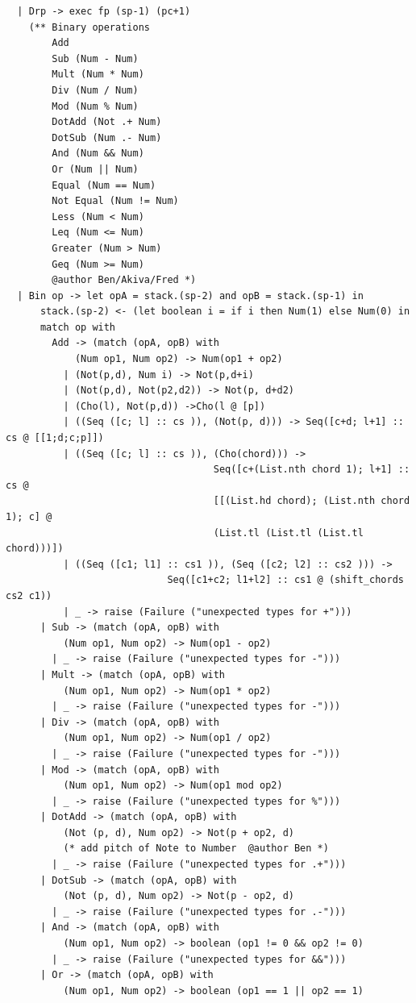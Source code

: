 \documentclass[12pt,A4]{book}
\begin{document}
\begin{verbatim}
  | Drp -> exec fp (sp-1) (pc+1)
    (** Binary operations
        Add
        Sub (Num - Num)
        Mult (Num * Num)
        Div (Num / Num)
        Mod (Num % Num)
        DotAdd (Not .+ Num)
        DotSub (Num .- Num)
        And (Num && Num)
        Or (Num || Num)
        Equal (Num == Num)
        Not Equal (Num != Num)
        Less (Num < Num)
        Leq (Num <= Num)
        Greater (Num > Num)
        Geq (Num >= Num) 
        @author Ben/Akiva/Fred *)
  | Bin op -> let opA = stack.(sp-2) and opB = stack.(sp-1) in     
      stack.(sp-2) <- (let boolean i = if i then Num(1) else Num(0) in
      match op with
        Add -> (match (opA, opB) with 
            (Num op1, Num op2) -> Num(op1 + op2)
          | (Not(p,d), Num i) -> Not(p,d+i)
          | (Not(p,d), Not(p2,d2)) -> Not(p, d+d2)
          | (Cho(l), Not(p,d)) ->Cho(l @ [p])
          | ((Seq ([c; l] :: cs )), (Not(p, d))) -> Seq([c+d; l+1] :: cs @ [[1;d;c;p]])
          | ((Seq ([c; l] :: cs )), (Cho(chord))) -> 
                                    Seq([c+(List.nth chord 1); l+1] :: cs @  
                                    [[(List.hd chord); (List.nth chord 1); c] @ 
                                    (List.tl (List.tl (List.tl chord)))])
          | ((Seq ([c1; l1] :: cs1 )), (Seq ([c2; l2] :: cs2 ))) -> 
                            Seq([c1+c2; l1+l2] :: cs1 @ (shift_chords cs2 c1))
          | _ -> raise (Failure ("unexpected types for +")))
      | Sub -> (match (opA, opB) with 
          (Num op1, Num op2) -> Num(op1 - op2)
        | _ -> raise (Failure ("unexpected types for -")))
      | Mult -> (match (opA, opB) with 
          (Num op1, Num op2) -> Num(op1 * op2)
        | _ -> raise (Failure ("unexpected types for -")))
      | Div -> (match (opA, opB) with 
          (Num op1, Num op2) -> Num(op1 / op2)
        | _ -> raise (Failure ("unexpected types for -")))
      | Mod -> (match (opA, opB) with 
          (Num op1, Num op2) -> Num(op1 mod op2)
        | _ -> raise (Failure ("unexpected types for %")))
      | DotAdd -> (match (opA, opB) with 
          (Not (p, d), Num op2) -> Not(p + op2, d) 
          (* add pitch of Note to Number  @author Ben *)
        | _ -> raise (Failure ("unexpected types for .+")))
      | DotSub -> (match (opA, opB) with 
          (Not (p, d), Num op2) -> Not(p - op2, d) 
        | _ -> raise (Failure ("unexpected types for .-")))
      | And -> (match (opA, opB) with 
          (Num op1, Num op2) -> boolean (op1 != 0 && op2 != 0)
        | _ -> raise (Failure ("unexpected types for &&")))
      | Or -> (match (opA, opB) with 
          (Num op1, Num op2) -> boolean (op1 == 1 || op2 == 1)

\end{verbatim}
\end{document}

